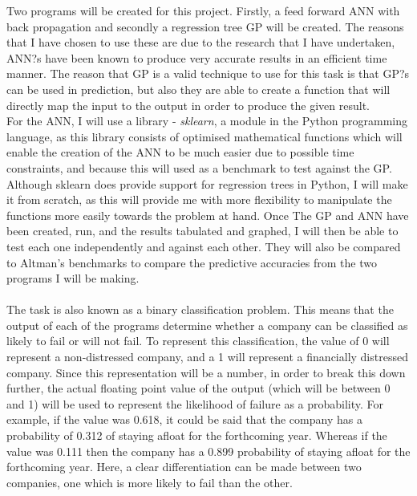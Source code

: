 \documentclass[11pt]{article}
\begin{document}
Two programs will be created for this project. Firstly, a feed forward ANN with back propagation and secondly a regression tree GP will be created. The reasons that I have chosen to use these are due to the research that I have undertaken, ANN?s have been known to produce very accurate results in an efficient time manner. The reason that GP is a valid technique to use for this task is that GP?s can be used in prediction, but also they are able to create a function that will directly map the input to the output in order to produce the given result. \\
For the ANN, I will use a library - \textit{sklearn}, a module in the Python programming language,  as this library consists of optimised mathematical functions which will enable the creation of the ANN to be much easier due to possible time constraints, and because this will used as a benchmark to test against the GP. Although sklearn does provide support for regression trees in Python, I will make it from scratch, as this will provide me with more flexibility to manipulate the functions more easily towards the problem at hand. 
Once The GP and ANN have been created, run, and the results tabulated and graphed, I will then be able to test each one independently and against each other. They will also be compared to Altman's benchmarks to compare the predictive accuracies from the two programs I will be making. \\\\
The task is also known as a binary classification problem. This means that the output of each of the programs determine whether a company can be classified as likely to fail or will not fail. To represent this classification, the value of 0 will represent a non-distressed company, and a 1 will represent a financially distressed company.
Since this representation will be a number, in order to break this down further, the actual floating point value of the output (which will be between 0 and 1) will be used  to represent the likelihood of failure as a probability. For example, if the value was 0.618, it could be said that the company has a probability of 0.312 of staying afloat for the forthcoming year. Whereas if the value was 0.111 then the company has a 0.899 probability of staying afloat for the forthcoming year. Here, a clear differentiation can be made between two companies, one which is more likely to fail than the other.


\newpage
\end{document}
